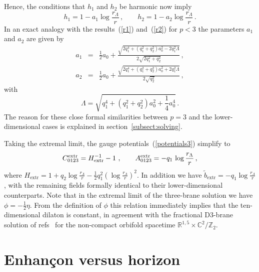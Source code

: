\documentclass[a4paper,11pt]{article}
\newcommand{\eqref}[1]{(\ref{#1})}
\newcommand{\ZZ}{\mathbb{Z}}  \newcommand{\Zint}{\mathbb{Z}}
\newcommand{\IR}{\mathbb{R}} \newcommand{\IC}{\mathbb{C}}
\begin{document}
Hence, the conditions that $h_1$ and $h_2$ be harmonic now imply
\begin{equation}
\label{h1h2p3}
h_1 = 1 - a_1 \log \frac{r_\Lambda}{r}\,, \qquad h_2 = 1 - a_2 \log
\frac{r_\Lambda}{r}\,.
\end{equation}
In an exact analogy with the results~\eqref{r1} and~\eqref{r2} for
$p<3$ the parameters $a_1$ and $a_2$ are given by
%
\begin{eqnarray}
\label{a1} a_1 &=& \frac{1}{2} a_0 + \frac{\sqrt{2q_1^4 + (q_1^2 + q_2^2)a_0^2 -
 2 q_1^2 \Lambda}}{2\sqrt{2q_1^2+q_2^2}} \,,\\[1.5ex] \label{a2} a_2
 &=& \frac{1}{2} a_0 + \frac{\sqrt{2q_1^4 + (q_1^2 + q_2^2)a_0^2 + 2
 q_1^2 \Lambda}}{2\sqrt{q_2^2}} \,,
\end{eqnarray}
%
with
%
\begin{equation}
\Lambda = \sqrt{q_1^4 + (q_1^2 +q_2^2)a_0^2 + \frac{1}{4}a_0^4} \,.
\end{equation}
%
The reason for these close formal similarities between $p=3$ and the
lower-dimensional cases is explained in section~\ref{subsect:solving}.

%
Taking the extremal limit, the gauge potentials~\eqref{potentials3}
simplify to
\begin{equation}
C_{0123}^{\mathrm{extr}} = H^{-1}_{\mathrm{extr}} - 1 \, \spa
%
A_{0123}^{\mathrm{extr}} = - q_1\,\log\frac{r_\Lambda}{r} \,,
\end{equation}
where $H_{\mathrm{extr}}=1+q_2\log\frac{r_\Lambda}{r}-\frac{1}{2}q_1^2
\left(\log\frac{r_\Lambda}{r}\right)^2$. In addition we have $\tilde
b_{\mathrm{extr}} = -q_1\log\frac{r_\Lambda}{r}$, with the remaining
fields formally identical to their lower-dimensional counterparts.
Note that in the extremal limit of the three-brane solution we have
$\phi=-\frac{1}{2}\eta$. From the definition of $\phi$ this relation
immediately implies that the ten-dimensional dilaton is constant, in
agreement with the fractional D3-brane solution of
refs~\cite{Bertolini:2000dk,Polchinski:2000mx} for the non-compact
orbifold spacetime $\IR^{1,5}\times\IC^2\!/\ZZ_2$.


\vspace{1ex}
\section{Enhan\c{c}on versus horizon}
\label{sect:enhancon}
\end{document}
